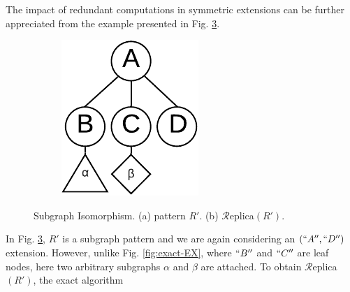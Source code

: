 The impact of redundant computations in symmetric extensions can be further
appreciated from the example presented in Fig. \ref{fig:approx_motive}. 
\begin{figure}[t]
	\vspace{-2mm}
	\centering
	\hspace*{0.25cm}
	\begin{subfigure}[b]{0.12\textwidth}
		\includegraphics[scale=0.4]{img_ex/triangle.pdf}
		\caption{}
		\label{fig:triangle}
	\end{subfigure}%
	\hspace*{0cm}
	\begin{subfigure}[b]{0.30\textwidth}
		\caption{}
		\label{fig:rep_triangle}
	\end{subfigure}
	\caption{Subgraph Isomorphism. (a) pattern $R'$. (b) $\mathcal{R}$eplica$(R')$.}
	\label{fig:approx_motive}
	 \vspace{-0.10in}
\end{figure}
In Fig.
\ref{fig:approx_motive}, $R'$ is a subgraph pattern and we are again considering
an $(``A'',``D'')$ extension. However, unlike Fig. \ref{fig:exact-EX}, where
$``B''$ and $``C''$ are leaf nodes, here two arbitrary subgraphs $\alpha$ and
$\beta$ are attached. To obtain $\mathcal{R}$eplica$(R')$, the exact algorithm
